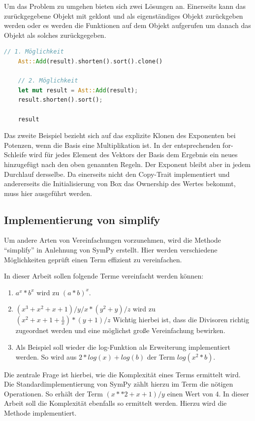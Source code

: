 \documentclass[11pt,a4paper, ngerman]{article}
\begin{document}
Um das Problem zu umgehen bieten sich zwei Lösungen an. Einerseits kann das zurückgegebene Objekt mit  geklont und als eigenständiges Objekt zurückgeben werden oder es werden die Funktionen auf dem Objekt aufgerufen um danach das Objekt als solches zurückgegeben.

\begin{lstlisting}[language=rust, caption={Mögliche Lösungen für Rückgabewerte}]
    // 1. Möglichkeit
    Ast::Add(result).shorten().sort().clone()

    // 2. Möglichkeit
    let mut result = Ast::Add(result);
    result.shorten().sort();

    result
\end{lstlisting}

Das zweite Beispiel bezieht sich auf das explizite Klonen des Exponenten bei Potenzen, wenn die Basis eine Multiplikation ist. In der entsprechenden for-Schleife wird für jedes Element des Vektors der Basis dem Ergebnis ein neues hinzugefügt nach den oben genannten Regeln. Der Exponent bleibt aber in jedem Durchlauf dersselbe. Da  einerseits nicht den Copy-Trait implementiert und andererseits die Initialisierung von Box das Ownership des Wertes bekommt, muss hier  ausgeführt werden.

\subsection{Implementierung von simplify}
Um andere Arten von Vereinfachungen vorzunehmen, wird die Methode ``simplify'' in Anlehnung von SymPy \cite{SymPySimplify} erstellt. Hier werden verschiedene Möglichkeiten geprüft einen Term effizient zu vereinfachen.

In dieser Arbeit sollen folgende Terme vereinfacht werden können:

\begin{enumerate}
    \item $a^x * b^x$ wird zu $(a*b)^x$.
    \item $(x^3+x^2+x+1)/y/x*(y^2+y)/z$ wird zu $(x^2+x+1+\frac{1}{x})*(y+1)/z$ Wichtig hierbei ist, dass die Divisoren richtig zugeordnet werden und eine möglichst große Vereinfachung bewirken.
    \item Als Beispiel soll wieder die log-Funktion als Erweiterung implementiert werden. So wird aus $2*log(x)+log(b)$ der Term $log(x^2*b)$.
\end{enumerate}

Die zentrale Frage ist hierbei, wie die Komplexität eines Terms ermittelt wird. Die Standardimplementierung von SymPy zählt hierzu im Term die nötigen Operationen. So erhält der Term $(x**2+x+1)/y$ einen Wert von 4. In dieser Arbeit soll die Komplexität ebenfalls so ermittelt werden. Hierzu wird die Methode  implementiert.
\end{document}
